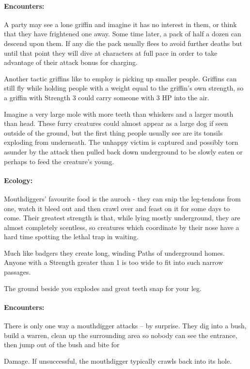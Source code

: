 \begin{multicols}{2}
\paragraph{Encounters:} A party may see a lone griffin and imagine it has no interest in them, or think that they have frightened one away.
Some time later, a pack of half a dozen can descend upon them.
If any die the pack usually flees to avoid further deaths but until that point they will dive at characters at full pace in order to take advantage of their attack bonus for charging.

Another tactic griffins like to employ is picking up smaller people.  Griffins can still fly while holding people with a weight equal to the griffin's own strength, so a griffin with Strength 3 could carry someone with 3 HP into the air.

\label{mouthdigger}

Imagine a very large mole with more teeth than whiskers and a larger mouth than head.  These furry creatures could almost appear as a large dog if seen outside of the ground, but the first thing people usually see are its tonsils exploding from underneath.  The unhappy victim is captured and possibly torn asunder by the attack then pulled back down underground to be slowly eaten or perhaps to feed the creature's young.

\paragraph{Ecology:} Mouthdiggers' favourite food is the auroch - they can snip the leg-tendons from one, watch it bleed out and then crawl over and feast on it for some days to come.  Their greatest strength is that, while lying mostly underground, they are almost completely scentless, so creatures which coordinate by their nose have a hard time spotting the lethal trap in waiting.

Much like badgers they create long, winding Paths of underground homes.  Anyone with a Strength greater than 1 is too wide to fit into such narrow passages.

\begin{boxtext}

	The ground beside you explodes and great teeth snap for your leg.

\end{boxtext}

\paragraph{Encounters:} There is only one way a mouthdigger attacks -- by surprise.  They dig into a bush, build a warren, clean up the surrounding area so nobody can see the entrance, then jump out of the bush and bite for \addtocounter{strb}{-5} Damage.  If unsuccessful, the mouthdigger typically crawls back into its hole.


\end{multicols}
